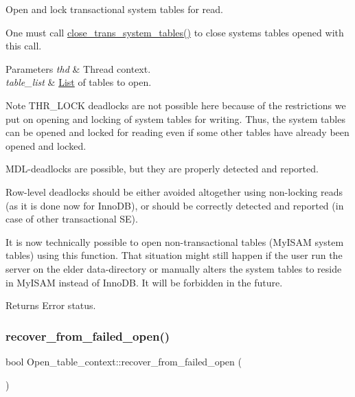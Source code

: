 Open and lock transactional system tables for read.

One must call \mbox{\hyperlink{group__Data__Dictionary_ga94ca9600b012ffde28a4a0360e91c0e8}{close\+\_\+trans\+\_\+system\+\_\+tables()}} to close systems tables opened with this call.


\begin{DoxyParams}{Parameters}
{\em thd} & Thread context. \\
\hline
{\em table\+\_\+list} & \mbox{\hyperlink{classList}{List}} of tables to open.\\
\hline
\end{DoxyParams}
\begin{DoxyNote}{Note}
T\+H\+R\+\_\+\+L\+O\+CK deadlocks are not possible here because of the restrictions we put on opening and locking of system tables for writing. Thus, the system tables can be opened and locked for reading even if some other tables have already been opened and locked.

M\+DL-\/deadlocks are possible, but they are properly detected and reported.

Row-\/level deadlocks should be either avoided altogether using non-\/locking reads (as it is done now for Inno\+DB), or should be correctly detected and reported (in case of other transactional SE).

It is now technically possible to open non-\/transactional tables (My\+I\+S\+AM system tables) using this function. That situation might still happen if the user run the server on the elder data-\/directory or manually alters the system tables to reside in My\+I\+S\+AM instead of Inno\+DB. It will be forbidden in the future.
\end{DoxyNote}
\begin{DoxyReturn}{Returns}
Error status. 
\end{DoxyReturn}
\mbox{\label{group__Data__Dictionary_gade48892bc4607303f7f4d3d6df4c39de}} 
\subsubsection{\texorpdfstring{recover\+\_\+from\+\_\+failed\+\_\+open()}{recover\_from\_failed\_open()}}
{\footnotesize\ttfamily bool Open\+\_\+table\+\_\+context\+::recover\+\_\+from\+\_\+failed\+\_\+open (\begin{DoxyParamCaption}{ }\end{DoxyParamCaption})}

